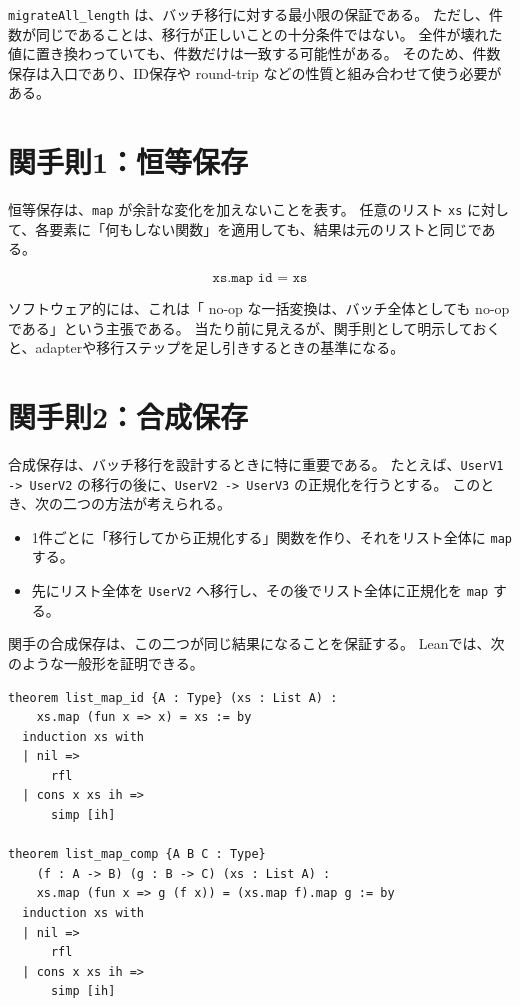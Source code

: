 \texttt{migrateAll\_length} は、バッチ移行に対する最小限の保証である。
ただし、件数が同じであることは、移行が正しいことの十分条件ではない。
全件が壊れた値に置き換わっていても、件数だけは一致する可能性がある。
そのため、件数保存は入口であり、ID保存や round-trip などの性質と組み合わせて使う必要がある。

\section{関手則1：恒等保存}

恒等保存は、\texttt{map} が余計な変化を加えないことを表す。
任意のリスト \texttt{xs} に対して、各要素に「何もしない関数」を適用しても、結果は元のリストと同じである。

\[
  \texttt{xs.map id = xs}
\]

ソフトウェア的には、これは「 no-op な一括変換は、バッチ全体としても no-op である」という主張である。
当たり前に見えるが、関手則として明示しておくと、adapterや移行ステップを足し引きするときの基準になる。

\section{関手則2：合成保存}

合成保存は、バッチ移行を設計するときに特に重要である。
たとえば、\texttt{UserV1 -> UserV2} の移行の後に、\texttt{UserV2 -> UserV3} の正規化を行うとする。
このとき、次の二つの方法が考えられる。

\begin{itemize}
\item 1件ごとに「移行してから正規化する」関数を作り、それをリスト全体に \texttt{map} する。
\item 先にリスト全体を \texttt{UserV2} へ移行し、その後でリスト全体に正規化を \texttt{map} する。
\end{itemize}

関手の合成保存は、この二つが同じ結果になることを保証する。
Leanでは、次のような一般形を証明できる。

\begin{listing}[htbp]
\begin{verbatim}
theorem list_map_id {A : Type} (xs : List A) :
    xs.map (fun x => x) = xs := by
  induction xs with
  | nil =>
      rfl
  | cons x xs ih =>
      simp [ih]

theorem list_map_comp {A B C : Type}
    (f : A -> B) (g : B -> C) (xs : List A) :
    xs.map (fun x => g (f x)) = (xs.map f).map g := by
  induction xs with
  | nil =>
      rfl
  | cons x xs ih =>
      simp [ih]
\end{verbatim}
\caption{\texttt{List.map} の恒等保存と合成保存}
\label{lst:ch24-list-functor-laws}
\end{listing}

